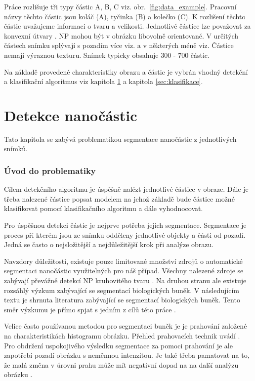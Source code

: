 \documentclass[11pt,twoside,a4paper,table]{book}
\begin{document}
Práce rozlišuje tři typy částic A, B, C viz. obr.~\ref{fig:data_example}. Pracovní názvy těchto částic jsou koláč (A), tyčinka (B) a kolečko (C). K rozlišení těchto částic uvažujeme informaci o tvaru a velikosti. Jednotlivé částice lze považovat za konvexní útvary \cite{art:np_convex}. NP mohou být v obrázku libovolně orientované.  V určitých částech snímku splývají s pozadím více viz. a v některých méně viz. Částice nemají výraznou texturu. Snímek typicky obsahuje 300 - 700 částic.

Na základě provedené charakteristiky obrazu a částic je vybrán vhodný detekční a klasifikační algoritmus viz kapitola \ref{sec:detekce} a kapitola \ref{sec:klasifikace}.


\chapter{Detekce nanočástic}
\label{sec:detekce}
Tato kapitola se zabývá problematikou segmentace nanočástic z jednotlivých snímků.

\subsection{Úvod do problematiky}

Cílem detekčního algoritmu je úspěšně nalézt jednotlivé částice v obraze. Dále je třeba nalezené částice popsat modelem na jehož základě bude částice možné klasifikovat pomocí klasifikačního algoritmu a dále vyhodnocovat.

Pro úspěšnou detekci částic je nejprve potřeba jejich segmentace. Segmentace je proces při kterém jsou ze snímku odděleny jednotlivé objekty a části od pozadí. Jedná se často o nejsložitější a nejdůležitější krok při analýze obrazu.

Navzdory důležitosti, existuje pouze limitované množství zdrojů o automatické segmentaci nanočástic využitelných pro náš případ. Všechny nalezené zdroje se zabývají převážně detekcí NP kruhovitého tvaru \cite{art:mcfarland}\cite{art:glotov}\cite{art:chen}. Na druhou stranu ale existuje rozsáhlý výzkum zabývající se segmentací biologických buněk. V následujícím textu je shrnuta literatura zabývající se segmentací biologických buněk. Tento směr výzkumu je přímo spjat s jedním z cílů této práce \cite{art:ultimate}.

Velice často používanou metodou pro segmentaci buněk je je prahování založené na charakteristikách histogramu obrázku. Přehled prahovacích technik uvádí \cite{art:sahoo88}. Pro obdržení uspokojivého výsledku segmentace za pomoci prahování je ale zapotřebí pozadí obrázku s neměnnou intenzitou. Je také třeba pamatovat na to, že malá změna v úrovni prahu může mít negativní dopad na na další analýzu obrázku \cite{art:wahlby}.
\end{document}

